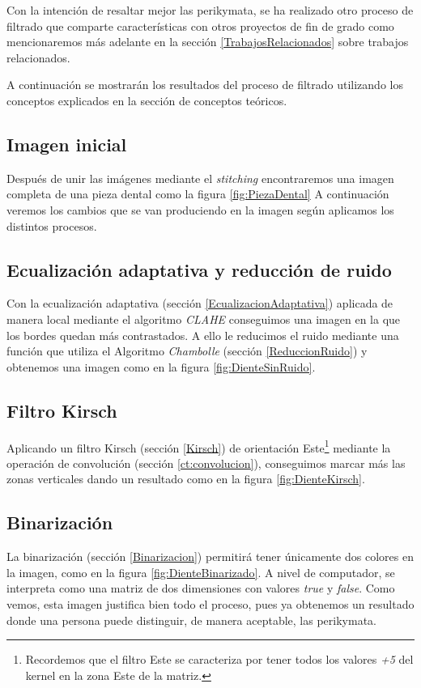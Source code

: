 Con la intención de resaltar mejor las perikymata, se ha realizado otro proceso de filtrado que comparte características con otros proyectos de fin de grado como mencionaremos más adelante en la sección \ref{TrabajosRelacionados} sobre trabajos relacionados.

A continuación se mostrarán los resultados del proceso de filtrado utilizando los conceptos explicados en la sección de conceptos teóricos.

\subsection{Imagen inicial}
Después de unir las imágenes mediante el \textit{stitching} encontraremos una imagen completa de una pieza dental como la figura \ref{fig:PiezaDental}
A continuación veremos los cambios que se van produciendo en la imagen según aplicamos los distintos procesos.

\subsection{Ecualización adaptativa y reducción de ruido}
Con la ecualización adaptativa (sección \ref{EcualizacionAdaptativa}) aplicada de manera local mediante el algoritmo \textit{CLAHE} \cite{wiki:CLAHE} conseguimos una imagen en la que los bordes quedan más contrastados. A ello le reducimos el ruido mediante una función que utiliza el Algoritmo \textit{Chambolle} (sección \ref{ReduccionRuido}) y obtenemos una imagen como en la figura \ref{fig:DienteSinRuido}.

\subsection{Filtro Kirsch}
Aplicando un filtro Kirsch (sección \ref{Kirsch}) \cite{scholar:venmathi2016kirsch} de orientación Este\footnote{Recordemos que el filtro Este se caracteriza por tener todos los valores \textit{+5} del kernel en la zona Este de la matriz.} mediante la operación de convolución (sección \ref{ct:convolucion}), conseguimos marcar más las zonas verticales dando un resultado como en la figura \ref{fig:DienteKirsch}. 

\newpage
\subsection{Binarización}
La binarización (sección \ref{Binarizacion}) permitirá tener únicamente dos colores en la imagen, como en la figura \ref{fig:DienteBinarizado}. A nivel de computador, se interpreta como una matriz de dos dimensiones con valores \textit{true} y \textit{false}.
Como vemos, esta imagen justifica bien todo el proceso, pues ya obtenemos un resultado donde una persona puede distinguir, de manera aceptable, las perikymata.

